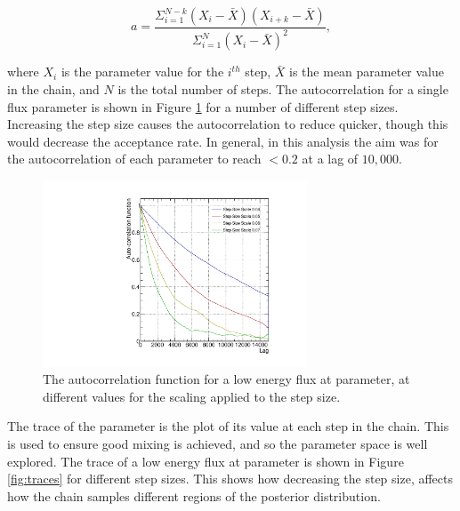 \begin{equation}
a = \frac{\Sigma^{N-k}_{i=1}(X_i - \bar{X})(X_{i+k} - \bar{X})}{\Sigma^N_{i=1}(X_i-\bar{X})^2},
\end{equation}

where $X_i$ is the parameter value for the $i^{th}$ step, $\bar{X}$ is the mean parameter value in the chain, and $N$ is the total number of steps. The autocorrelation for a single flux parameter is shown in Figure \ref{fig:autocorr} for a number of different step sizes. Increasing the step size causes the autocorrelation to reduce quicker, though this would decrease the acceptance rate. In general, in this analysis the aim was for the autocorrelation of each parameter to reach $< 0.2$ at a lag of $10,000$.

\begin{figure}[!htbp]
\centering
\includegraphics*[width=0.7\textwidth,clip]{figs/autoCorr}
\caption{The autocorrelation function for a low energy flux at parameter, at different values for the scaling applied to the step size.}\label{fig:autocorr}
\end{figure}

The trace of the parameter is the plot of its value at each step in the chain. This is used to ensure good mixing is achieved, and so the parameter space is well explored. The trace of a low energy flux at parameter is shown in Figure \ref{fig:traces} for different step sizes. This shows how decreasing the step size, affects how the chain samples different regions of the posterior distribution.

